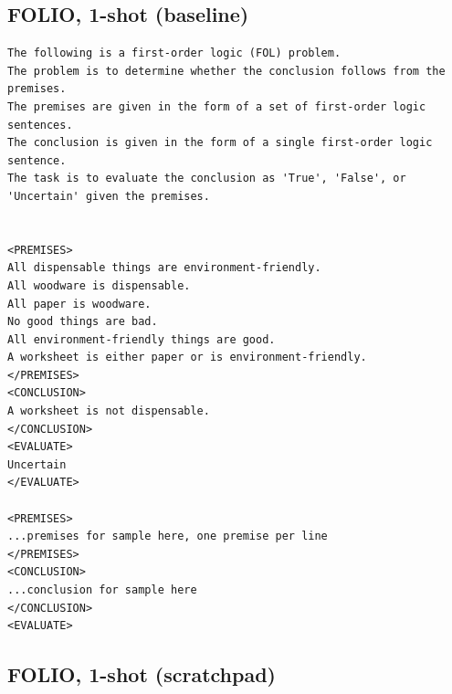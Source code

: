\subsection{FOLIO, 1-shot (baseline)}
\begin{lstlisting}[caption={todo},captionpos=b, breaklines=true]
The following is a first-order logic (FOL) problem.
The problem is to determine whether the conclusion follows from the premises.
The premises are given in the form of a set of first-order logic sentences.
The conclusion is given in the form of a single first-order logic sentence.
The task is to evaluate the conclusion as 'True', 'False', or 'Uncertain' given the premises.


<PREMISES>
All dispensable things are environment-friendly.
All woodware is dispensable.
All paper is woodware.
No good things are bad.
All environment-friendly things are good.
A worksheet is either paper or is environment-friendly.
</PREMISES>
<CONCLUSION>
A worksheet is not dispensable.
</CONCLUSION>
<EVALUATE>
Uncertain
</EVALUATE>

<PREMISES>
...premises for sample here, one premise per line
</PREMISES>
<CONCLUSION>
...conclusion for sample here
</CONCLUSION>
<EVALUATE>
\end{lstlisting}

\subsection{FOLIO, 1-shot (scratchpad)}

